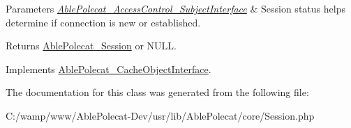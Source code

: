 \begin{DoxyParams}{Parameters}
{\em \hyperlink{interface_able_polecat___access_control___subject_interface}{Able\+Polecat\+\_\+\+Access\+Control\+\_\+\+Subject\+Interface}} & Session status helps determine if connection is new or established.\\
\hline
\end{DoxyParams}
\begin{DoxyReturn}{Returns}
\hyperlink{class_able_polecat___session}{Able\+Polecat\+\_\+\+Session} or N\+U\+L\+L. 
\end{DoxyReturn}


Implements \hyperlink{interface_able_polecat___cache_object_interface_a3f2135f6ad45f51d075657f6d20db2cd}{Able\+Polecat\+\_\+\+Cache\+Object\+Interface}.



The documentation for this class was generated from the following file\+:\begin{DoxyCompactItemize}
\item 
C\+:/wamp/www/\+Able\+Polecat-\/\+Dev/usr/lib/\+Able\+Polecat/core/Session.\+php\end{DoxyCompactItemize}
